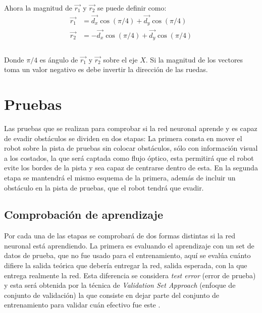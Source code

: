 \documentclass{iccmemoria}
\begin{document}
Ahora la magnitud de $\vec{r_{1}}$ y $\vec{r_{2}}$ se puede definir como:\\

\begin{equation}
	\begin{split}
	\vec{r_{1}} & = \vec{d_{x}}\cos(\pi/4)  + \vec{d_{y}}\cos(\pi/4)\\
	\vec{r_{2}} & = -\vec{d_{x}}\cos(\pi/4) + \vec{d_{y}}\cos(\pi/4)\\
	\end{split}
\end{equation}\\

Donde $\pi/4$ es ángulo de $\vec{r_{1}}$ y $\vec{r_{2}}$ sobre el eje $X$. Si la magnitud de los vectores toma un valor negativo es debe invertir la dirección de las ruedas.\\

\chapter{Pruebas}

Las pruebas que se realizan para comprobar si la red neuronal aprende y es capaz de evadir obstáculos se dividen en dos etapas: La primera consta en mover el robot sobre la pista de pruebas sin colocar obstáculos, sólo con información visual a los costados, la que será captada como flujo óptico, esta permitirá que el robot evite los bordes de la pista y sea capaz de centrarse dentro de esta. En la segunda etapa se mantendrá el mismo esquema de la primera, además de incluir un obstáculo en la pista de pruebas, que el robot tendrá que evadir.\\

\section{Comprobación de aprendizaje}

Por cada una de las etapas se comprobará de dos formas distintas si la red neuronal está aprendiendo. La primera es evaluando el aprendizaje con un set de datos de prueba, que no fue usado para el entrenamiento, aquí se evalúa cuánto difiere la salida teórica que debería entregar la red, salida esperada, con la que entrega realmente la red. Esta diferencia se considera \emph{test error} (error de prueba) y esta será obtenida por la técnica de \emph{Validation Set Approach} (enfoque de conjunto de validación) la que consiste en dejar parte del conjunto de entrenamiento para validar cuán efectivo fue este \cite{james2014introduction}.\\
\end{document}

